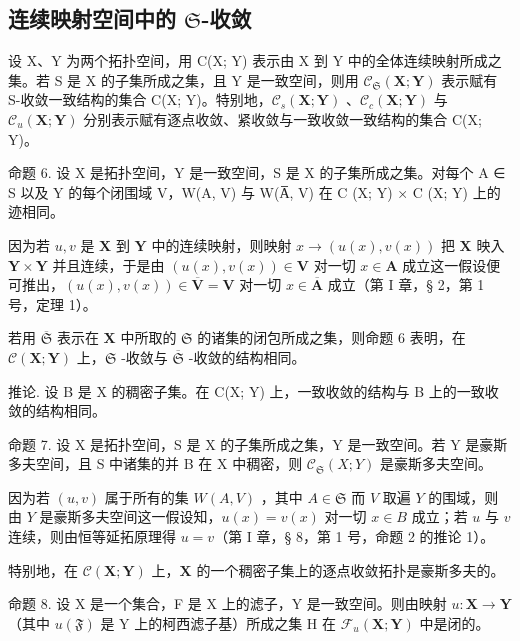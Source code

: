 \subsection{\texorpdfstring{连续映射空间中的 \(\mathfrak{S}\)-收敛}{连续映射空间中的 S-收敛}}

设 X、Y 为两个拓扑空间，用 C(X; Y) 表示由 X 到 Y 中的全体连续映射所成之集。若 S 是 X 的子集所成之集，且 Y 是一致空间，则用 \(\mathcal{C}_{\mathfrak{S}}(\mathbf{X};\mathbf{Y})\) 表示赋有 S-收敛一致结构的集合 C(X; Y)。特别地，\(\mathcal{C}_{s}(\mathbf{X};\mathbf{Y})\) 、\(\mathcal{C}_{c}(\mathbf{X};\mathbf{Y})\) 与 \(\mathcal{C}_{u}(\mathbf{X};\mathbf{Y})\) 分别表示赋有逐点收敛、紧收敛与一致收敛一致结构的集合 C(X; Y)。

命题 6. 设 X 是拓扑空间，Y 是一致空间，S 是 X 的子集所成之集。对每个 A ∈ S 以及 Y 的每个闭围域 V，W(A, V) 与 W(A̅, V) 在 C (X; Y) × C (X; Y) 上的迹相同。

因为若 \(u, v\) 是 \(\mathbf{X}\) 到 \(\mathbf{Y}\) 中的连续映射，则映射 \(x \to (u(x), v(x))\) 把 \(\mathbf{X}\) 映入 \(\mathbf{Y} \times \mathbf{Y}\) 并且连续，于是由 \((u(x), v(x)) \in \mathbf{V}\) 对一切 \(x \in \mathbf{A}\) 成立这一假设便可推出，\((u(x), v(x)) \in \overline{\mathbf{V}} = \mathbf{V}\) 对一切 \(x \in \overline{\mathbf{A}}\) 成立（第 I 章，§ 2，第 1 号，定理 1）。

若用 \(\overline{\mathfrak{S}}\) 表示在 \(\mathbf{X}\) 中所取的 \(\mathfrak{S}\) 的诸集的闭包所成之集，则命题 6 表明，在 \(\mathcal{C}(\mathbf{X};\mathbf{Y})\) 上，\(\mathfrak{S}\) -收敛与 \(\overline{\mathfrak{S}}\) -收敛的结构相同。

推论. 设 B 是 X 的稠密子集。在 C(X; Y) 上，一致收敛的结构与 B 上的一致收敛的结构相同。

命题 7. 设 X 是拓扑空间，S 是 X 的子集所成之集，Y 是一致空间。若 Y 是豪斯多夫空间，且 S 中诸集的并 B 在 X 中稠密，则 \(\mathcal{C}_{\mathfrak{S}}(X;Y)\) 是豪斯多夫空间。

因为若 \((u, v)\) 属于所有的集 \(W(A, V)\) ，其中 \(A \in \mathfrak{S}\) 而 \(V\) 取遍 \(Y\) 的围域，则由 \(Y\) 是豪斯多夫空间这一假设知，\(u(x) = v(x)\) 对一切 \(x \in B\) 成立；若 \(u\) 与 \(v\) 连续，则由恒等延拓原理得 \(u = v\)（第 I 章，§ 8，第 1 号，命题 2 的推论 1）。

特别地，在 \(\mathcal{C}(\mathbf{X};\mathbf{Y})\) 上，\(\mathbf{X}\) 的一个稠密子集上的逐点收敛拓扑是豪斯多夫的。

命题 8. 设 X 是一个集合，F 是 X 上的滤子，Y 是一致空间。则由映射 \(u: \mathbf{X} \to \mathbf{Y}\) （其中 \(u(\mathfrak{F})\) 是 Y 上的柯西滤子基）所成之集 H 在 \(\mathcal{F}_u(\mathbf{X}; \mathbf{Y})\) 中是闭的。

